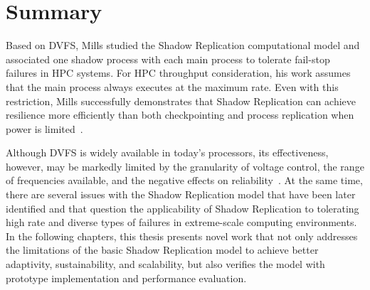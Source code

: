 \section{Summary}
Based on DVFS, Mills studied the Shadow Replication computational model and associated one shadow process with each main process to tolerate fail-stop failures in HPC systems. For HPC throughput consideration, his work assumes that the main process always executes at the maximum rate. Even with this restriction, Mills successfully demonstrates that Shadow Replication can achieve resilience more efficiently than both checkpointing and process replication when power is limited~\cite{mills_2014_icnc,mills_2014_pdp,mills2014power}.

Although DVFS is widely available in today's processors, its effectiveness, however, may be markedly limited by the granularity of voltage control, the range of frequencies available, and the negative effects on reliability~\cite{Eyerman:2011:FDU:1952998.1952999,zhao2008reliability,zhao2011generalized}. At the same time, there are several issues with the Shadow Replication model that have been later identified and that question the applicability of Shadow Replication to tolerating high rate and diverse types of failures in extreme-scale computing environments. 
In the following chapters, this thesis presents novel work that not only addresses the limitations of the basic Shadow Replication model to achieve better adaptivity, sustainability, and scalability, but also verifies the model with prototype implementation and performance evaluation.
 



